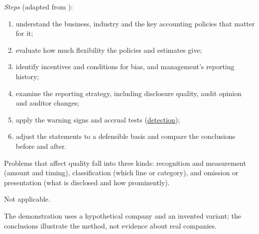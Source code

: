 \begin{qfmethod}\label{meth:report-quality-evaluation}
 \emph{Steps} (adapted from \citep[pp.~111--113]{financial-statement-analysis-2009}):
\begin{enumerate}
\item understand the business, industry and the key accounting policies that matter for it;
\item evaluate how much flexibility the policies and estimates give;
\item identify incentives and conditions for bias, and management's reporting history;
\item examine the reporting strategy, including disclosure quality, audit opinion and auditor changes;
\item apply the warning signs and accrual tests (\hyperref[meth:reporting-warning-signs]{detection});
\item adjust the statements to a defensible basis and compare the conclusions before and after.
\end{enumerate}
Problems that affect quality fall into three kinds: recognition and measurement (amount and timing), classification (which line or category), and omission or presentation (what is disclosed and how prominently).

 Not applicable.

 The demonstration uses a hypothetical company and an invented variant; the conclusions illustrate the method, not evidence about real companies.


\end{qfmethod}
